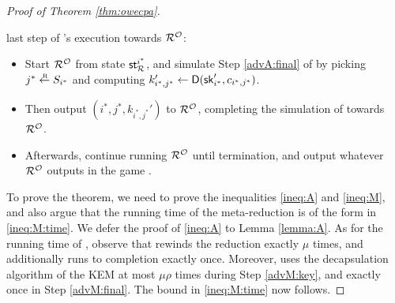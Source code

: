 \begin{proof}[Proof of Theorem \ref{thm:owecpa}]
\begin{enumerate}[itemsep=0.1cm]
          last step of \advA's execution towards \(\redR^{\oracle}\):
          \begin{itemize}[label={\textbullet},itemsep=0.1cm]
            \item Start \(\redR^{\oracle}\) from state \(\state_{\redR}^{i^{*}}\),
                  and simulate Step \ref{advA:final} of \advA by picking \(j^{*} \sampleR S_{i^{*}}\)
                  and computing \(k_{i^{*},j^{*}}' \leftarrow \mathsf{D}(\mathsf{sk}_{i^{*}}',c_{i^{*},j^{*}})\).
            \item Then output \((i^{*},j^{*}, k_{i^{*},j^{*}}')\) to \(\redR^{\oracle}\),
                  completing the simulation of \advA towards \(\redR^{\oracle}\).
            \item Afterwards, continue running \(\redR^{\oracle}\)
                  until termination, and output whatever \(\redR^{\oracle}\)
                  outputs in the game \SICA.
          \end{itemize}
  \end{enumerate}

  To prove the theorem, we need to prove the inequalities \eqref{ineq:A} and \eqref{ineq:M},
  and also argue that the running time of the meta-reduction \redM is of the form in \eqref{ineq:M:time}.
  We defer the proof of \eqref{ineq:A} to Lemma \ref{lemma:A}.
  As for the running time of \redM,
  observe that \redM rewinds the reduction \redR exactly \(\mu\) times,
  and additionally runs \redR to completion exactly once.
  Moreover, \redM uses the decapsulation algorithm \Decaps of the KEM \KEM
  at most \(\mu \rho\) times during Step \ref{advM:key},
  and exactly once in Step \ref{advM:final}.
  The bound in \eqref{ineq:M:time} now follows.


\end{proof}
